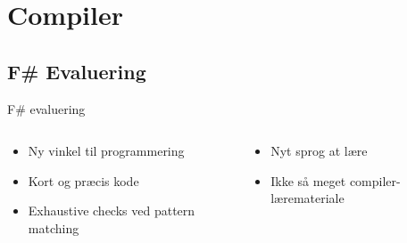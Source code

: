 \section{Compiler}

\subsection{F\# Evaluering}
\begin{frame}{F\# evaluering}
  \begin{columns}
    \begin{column}{.5\textwidth}
      \begin{itemize}
        \item Ny vinkel til programmering
        \item Kort og præcis kode
        \item Exhaustive checks ved pattern matching
      \end{itemize}
    \end{column}
    
    \begin{column}{.5\textwidth}
      \begin{itemize}
        \item Nyt sprog at lære
        \item Ikke så meget compiler-læremateriale
      \end{itemize}
    \end{column}
  \end{columns}
\end{frame}

